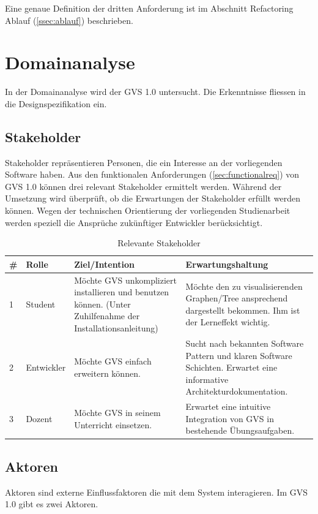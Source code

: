 \documentclass[11pt,a4paper,english,oneside]{book}
\numberwithin{equation}{chapter}
\begin{document}
	\noindent
	Eine genaue Definition der dritten Anforderung ist im Abschnitt Refactoring Ablauf (\ref{ssec:ablauf}) beschrieben.
	
	\section{Domainanalyse}
	In der Domainanalyse wird der GVS 1.0 untersucht. Die Erkenntnisse fliessen in die Designspezifikation ein.
		
	\subsection{Stakeholder} \label{ssec:stakeholder}
	Stakeholder repräsentieren Personen, die ein Interesse an der vorliegenden Software haben. Aus den funktionalen Anforderungen (\ref{sec:functionalreq}) von GVS 1.0 können drei relevant Stakeholder ermittelt werden. Während der Umsetzung wird überprüft, ob die Erwartungen der Stakeholder erfüllt werden können. Wegen der technischen Orientierung der vorliegenden Studienarbeit werden speziell die Ansprüche zukünftiger Entwickler berücksichtigt.
	
	\begin{table}[h!]
		\centering
		\begin{tabularx}{\linewidth}{l l X X}
			\toprule 
			\# & Rolle & Ziel/Intention & Erwartungshaltung \\
			\midrule
			1 & Student & Möchte GVS unkompliziert installieren und benutzen können. (Unter Zuhilfenahme der Installationsanleitung) & Möchte den zu visualisierenden Graphen/Tree ansprechend dargestellt bekommen. Ihm ist der Lerneffekt wichtig.  \\
			2 & Entwickler & Möchte GVS einfach erweitern können. & Sucht nach bekannten Software Pattern und klaren Software Schichten. Erwartet eine informative Architekturdokumentation. \\			
			3 & Dozent & Möchte GVS in seinem Unterricht einsetzen. & Erwartet eine intuitive Integration von GVS in bestehende Übungsaufgaben. \\
			\bottomrule 
		\end{tabularx} 
		\caption{Relevante Stakeholder} 
	\end{table}

	\subsection{Aktoren} \label{ssec:actors}
	Aktoren sind externe Einflussfaktoren die mit dem System interagieren. Im GVS 1.0 gibt es zwei Aktoren.
	
\end{document}

